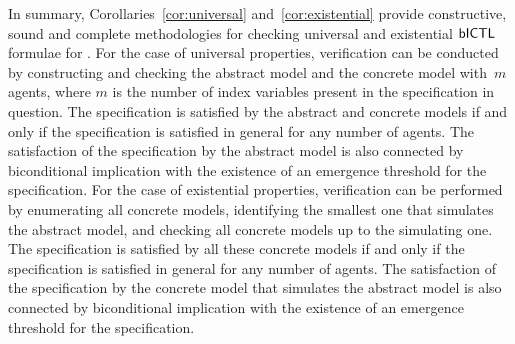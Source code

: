 In summary, Corollaries~\ref{cor:universal} and~\ref{cor:existential} provide
constructive, sound and complete methodologies for checking universal and 
existential $\sf{bICTL}$ formulae for \panos{}.  
For the case of universal properties,
verification can be conducted by constructing and checking the abstract model
and the concrete model with~$m$ agents, where $m$ is the number of index
variables present in the specification in question. The specification is satisfied by
the abstract and concrete models if and only if the specification is satisfied in general
for any number of agents.  The satisfaction of the specification by the abstract
model is also connected by biconditional implication with the existence of an
emergence threshold for the specification.
For the case of  existential properties,
verification can be performed by enumerating all concrete models, identifying
the smallest one that simulates the abstract model, and checking all concrete
models up to the simulating one.  The specification is satisfied by all these
concrete models if and only if the specification is satisfied in general for any number of
agents.   The satisfaction of the specification by the concrete model that
simulates the abstract model is also connected by biconditional implication with
the existence of an emergence threshold for the specification. 









